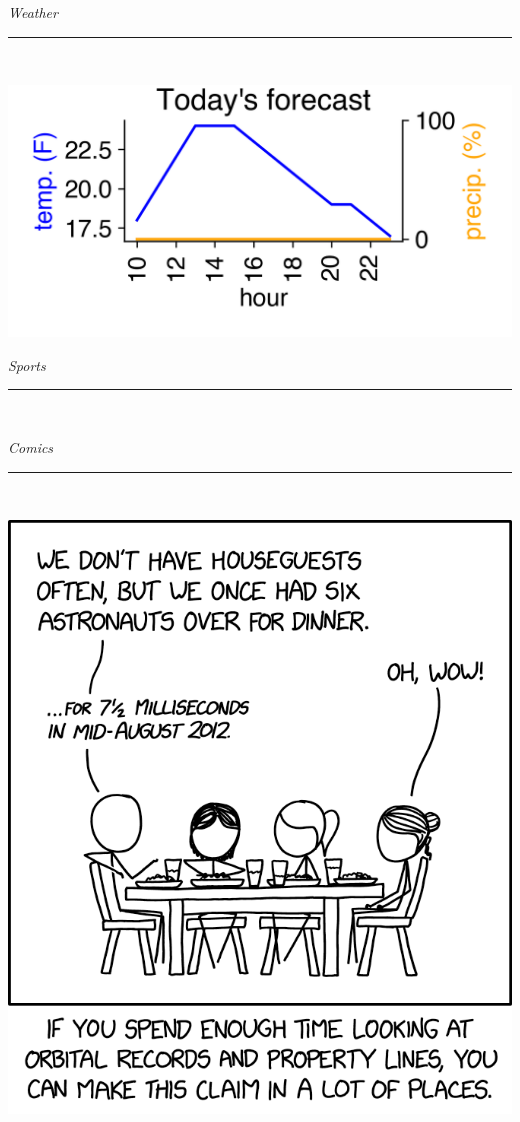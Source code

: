 \documentclass{article}
\date{\today}
\renewcommand\headline[1]{\begin{center} {\huge \textsl{ #1}}\\ %
			\rule[5pt]{0.8\hsize}{0.5pt}\\ \end{center}}
\begin{document}
\maketitle

\begin{multicols}{3}

\headline{Weather}
\center\includegraphics[width=\linewidth]{images/forecast.png}

\headline{Sports}
\lipsum[1]

\headline{Comics}
\center\includegraphics[width=\linewidth]{images/comic.png}


\end{multicols}
\end{document}
